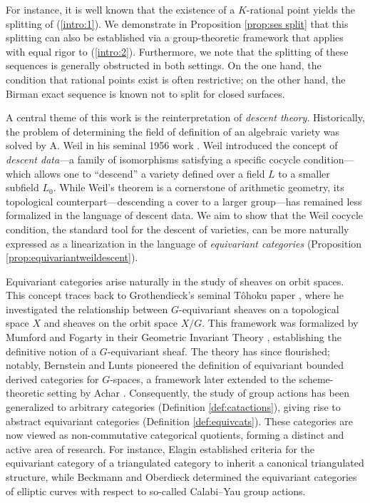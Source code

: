 \documentclass[10pt]{amsart}
\theoremstyle{definition}
\begin{document}
For instance, it is well known that the existence of a $K$-rational point yields the splitting of (\ref{intro:1}). We demonstrate in Proposition \ref{prop:ses split} that this splitting can also be established via a group-theoretic framework that applies with equal rigor to (\ref{intro:2}). Furthermore, we note that the splitting of these sequences is generally obstructed in both settings. On the one hand, the condition that rational points exist is often restrictive; on the other hand, the Birman exact sequence is known not to split for closed surfaces.

A central theme of this work is the reinterpretation of \textit{descent theory}. Historically, the problem of determining the field of definition of an algebraic variety was solved by A. Weil in his seminal 1956 work \cite{Weil56}. Weil introduced the concept of \textit{descent data}—a family of isomorphisms satisfying a specific cocycle condition—which allows one to ``descend'' a variety defined over a field $L$ to a smaller subfield $L_0$. While Weil's theorem is a cornerstone of arithmetic geometry, its topological counterpart—descending a cover to a larger group—has remained less formalized in the language of descent data. We aim to show that the Weil cocycle condition, the standard tool for the descent of varieties, can be more naturally expressed as a linearization in the language of \textit{equivariant categories} (Proposition \ref{prop:equivariantweildescent}).

Equivariant categories arise naturally in the study of sheaves on orbit spaces. This concept traces back to Grothendieck's seminal T\^ohoku paper \cite{GroTo}, where he investigated the relationship between $G$-equivariant sheaves on a topological space $X$ and sheaves on the orbit space $X/G$. This framework was formalized by Mumford and Fogarty in their Geometric Invariant Theory \cite{MR1304906}, establishing the definitive notion of a $G$-equivariant sheaf. The theory has since flourished; notably, Bernstein and Lunts \cite{BerLuntsEquiv} pioneered the definition of equivariant bounded derived categories for $G$-spaces, a framework later extended to the scheme-theoretic setting by Achar \cite{Achar}. Consequently, the study of group actions has been generalized to arbitrary categories (Definition \ref{def:catactions}), giving rise to abstract equivariant categories (Definition \ref{def:equivcats}). These categories are now viewed as non-commutative categorical quotients, forming a distinct and active area of research. For instance, Elagin \cite{elagin2015equivarianttriangulatedcategories} established criteria for the equivariant category of a triangulated category to inherit a canonical triangulated structure, while Beckmann and Oberdieck \cite{MR4589277} determined the equivariant categories of elliptic curves with respect to so-called Calabi–Yau group actions.
\end{document}
